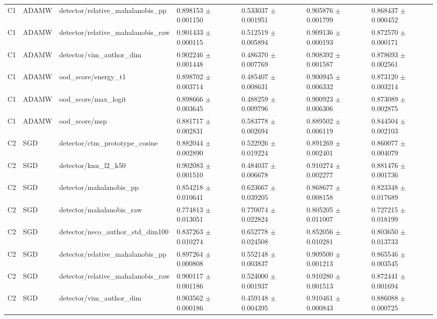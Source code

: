 \begin{longtable}{lllllll}
C1 & ADAMW & detector/relative\_mahalanobis\_pp & 0.898153 $\pm$ 0.001150 & 0.533037 $\pm$ 0.001951 & 0.905876 $\pm$ 0.001799 & 0.868437 $\pm$ 0.000452 \\
C1 & ADAMW & detector/relative\_mahalanobis\_raw & 0.901433 $\pm$ 0.000115 & 0.512519 $\pm$ 0.005894 & 0.909136 $\pm$ 0.000193 & 0.872570 $\pm$ 0.000171 \\
C1 & ADAMW & detector/vim\_author\_dim & 0.902246 $\pm$ 0.001448 & 0.486370 $\pm$ 0.007769 & 0.908392 $\pm$ 0.001587 & 0.878693 $\pm$ 0.002561 \\
C1 & ADAMW & ood\_score/energy\_t1 & 0.898702 $\pm$ 0.003714 & 0.485407 $\pm$ 0.008631 & 0.900945 $\pm$ 0.006332 & 0.873120 $\pm$ 0.003214 \\
C1 & ADAMW & ood\_score/max\_logit & 0.898666 $\pm$ 0.003645 & 0.488259 $\pm$ 0.009796 & 0.900923 $\pm$ 0.006306 & 0.873089 $\pm$ 0.002875 \\
C1 & ADAMW & ood\_score/msp & 0.881717 $\pm$ 0.002831 & 0.583778 $\pm$ 0.002694 & 0.889502 $\pm$ 0.006119 & 0.844504 $\pm$ 0.002103 \\
C2 & SGD & detector/ctm\_prototype\_cosine & 0.882044 $\pm$ 0.002890 & 0.522926 $\pm$ 0.019224 & 0.891269 $\pm$ 0.002401 & 0.860077 $\pm$ 0.004079 \\
C2 & SGD & detector/knn\_l2\_k50 & 0.902083 $\pm$ 0.001510 & 0.484037 $\pm$ 0.006678 & 0.910274 $\pm$ 0.002277 & 0.881476 $\pm$ 0.001736 \\
C2 & SGD & detector/mahalanobis\_pp & 0.854218 $\pm$ 0.010641 & 0.623667 $\pm$ 0.039205 & 0.868677 $\pm$ 0.008158 & 0.823348 $\pm$ 0.017689 \\
C2 & SGD & detector/mahalanobis\_raw & 0.774813 $\pm$ 0.013051 & 0.770074 $\pm$ 0.022824 & 0.805205 $\pm$ 0.011007 & 0.727215 $\pm$ 0.018199 \\
C2 & SGD & detector/neco\_author\_std\_dim100 & 0.837263 $\pm$ 0.010274 & 0.652778 $\pm$ 0.024508 & 0.852056 $\pm$ 0.010281 & 0.803650 $\pm$ 0.013733 \\
C2 & SGD & detector/relative\_mahalanobis\_pp & 0.897264 $\pm$ 0.000808 & 0.552148 $\pm$ 0.003837 & 0.909500 $\pm$ 0.001213 & 0.865546 $\pm$ 0.003545 \\
C2 & SGD & detector/relative\_mahalanobis\_raw & 0.900117 $\pm$ 0.001186 & 0.524000 $\pm$ 0.001937 & 0.910280 $\pm$ 0.001513 & 0.872441 $\pm$ 0.001694 \\
C2 & SGD & detector/vim\_author\_dim & 0.903562 $\pm$ 0.000186 & 0.459148 $\pm$ 0.004395 & 0.910461 $\pm$ 0.000843 & 0.886088 $\pm$ 0.000725 \\

\end{longtable}
